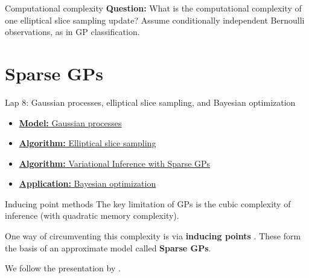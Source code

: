 \documentclass[aspectratio=169]{beamer}
\begin{document}
\begin{frame}[t]{Computational complexity}
\textbf{Question: } What is the computational complexity of one elliptical slice sampling update? Assume conditionally independent Bernoulli observations, as in GP classification.
\end{frame}

\section{Sparse GPs}
\label{sec:spgps}

\begin{frame}{Lap 8: Gaussian processes, elliptical slice sampling, and Bayesian optimization}
\begin{itemize}
    \item \hyperref[sec:gps]{\textbf{Model:} Gaussian processes}
    \item \hyperref[sec:ess]{\textbf{Algorithm:} Elliptical slice sampling}
    \item \hyperref[sec:spgps]{\textbf{Algorithm:} Variational Inference with Sparse GPs}
    \item \hyperref[sec:bopt]{\textbf{Application:} Bayesian optimization}
\end{itemize}
\end{frame}


\begin{frame}{Inducing point methods}
The key limitation of GPs is the cubic complexity of inference (with quadratic memory complexity). 

One way of circumventing this complexity is via \textbf{inducing points} \citep{csato2002, snelson2005, tisias2009}. These form the basis of an approximate model called \textbf{Sparse GPs}.

We follow the presentation by \citet{Hensman2013-cf}.
\end{frame}
\end{document}
